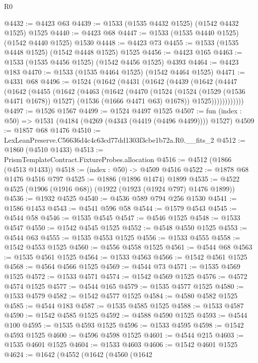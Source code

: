 \begin{lexlean}{R0}
\begin{coremodule}
@4432 := @4423 @63
@4439 := @1533 (@1535 @4432 @1525) (@1542 @4432 @1525) @1525
@4440 := @4423 @68
@4447 := @1533 (@1535 @4440 @1525) (@1542 @4440 @1525) @1530
@4448 := @4423 @73
@4455 := @1533 (@1535 @4448 @1525) (@1542 @4448 @1525) @1525
@4456 := @4423 @165
@4463 := @1533 (@1535 @4456 @1525) (@1542 @4456 @1525) @4393
@4464 := @4423 @183
@4470 := @1533 (@1535 @4464 @1525) (@1542 @4464 @1525)
@4471 := @4331 @68
@4496 := @1524
    (@1642
      (@4431
        (@1642
          (@4439
            (@1642
              (@4447
                (@1642
                  (@4455
                    (@1642
                      (@4463
                        (@1642
                          (@4470
                            (@1524
                              (@1524 (@1529 (@1536 @4471 @1678)) @1527)
                              (@1536 (@1666 @4471 @63) @1678))
                            @1525))))))))))))
@4497 := @1526 @1567
@4499 := @1524 @4497 @1525
@4507 := fun (index : @50) => @1531 (@4184 (@4269 (@4343 (@4419 (@4496 @4499)))) @1527)
@4509 := @1857 @68 @1476
@4510 := LexLeanPreserve.C56636d4c4c63cd77dd1303f3cbe1b72a.R0.__fits_2
@4512 := @1860 (@4510 @1433)
@4513 := PrismTemplateContract.FixtureProbes.allocation
@4516 := @4512 (@1866 (@4513 @1433))
@4518 := (index : @50) -> @4509 @4516
@4522 := @1878 @68 @1476 @4516 @797
@4525 := @1886 (@1896 @1474) @1899
@4535 := @4522 @4525 (@1906 (@1916 @68)) (@1922 (@1923 (@1924 @797) @1476 @1899))
@4536 := @1932 @4525
@4540 := @4536 @589 @794 @256 @1530
@4541 := @1586 @1453
@4543 := @4541 @596 @58
@4544 := @1579 @4543
@4545 := @4544 @58
@4546 := @1535 @4545
@4547 := @4546 @1525
@4548 := @1533 @4547
@4550 := @1542 @4545 @1525
@4552 := @4548 @4550 @1525
@4553 := @4544 @63
@4555 := @1535 @4553 @1525
@4556 := @1533 @4555
@4558 := @1542 @4553 @1525
@4560 := @4556 @4558 @1525
@4561 := @4544 @68
@4563 := @1535 @4561 @1525
@4564 := @1533 @4563
@4566 := @1542 @4561 @1525
@4568 := @4564 @4566 @1525
@4569 := @4544 @73
@4571 := @1535 @4569 @1525
@4572 := @1533 @4571
@4574 := @1542 @4569 @1525
@4576 := @4572 @4574 @1525
@4577 := @4544 @165
@4579 := @1535 @4577 @1525
@4580 := @1533 @4579
@4582 := @1542 @4577 @1525
@4584 := @4580 @4582 @1525
@4585 := @4544 @183
@4587 := @1535 @4585 @1525
@4588 := @1533 @4587
@4590 := @1542 @4585 @1525
@4592 := @4588 @4590 @1525
@4593 := @4544 @100
@4595 := @1535 @4593 @1525
@4596 := @1533 @4595
@4598 := @1542 @4593 @1525
@4600 := @4596 @4598 @1525
@4601 := @4544 @215
@4603 := @1535 @4601 @1525
@4604 := @1533 @4603
@4606 := @1542 @4601 @1525
@4624 := @1642
    (@4552
      (@1642
        (@4560
          (@1642

\end{coremodule}
\end{lexlean}
